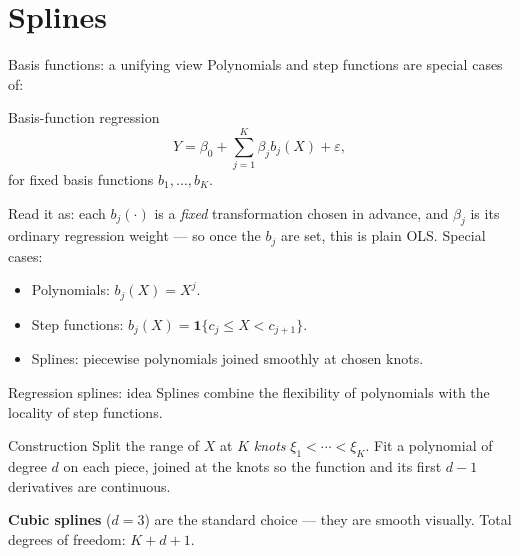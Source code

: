\documentclass[aspectratio=169,11pt]{beamer}
\begin{document}
\section{Splines}

\begin{frame}{Basis functions: a unifying view}
  Polynomials and step functions are special cases of:
  \begin{block}{Basis-function regression}
    \[
      Y = \beta_0 + \sum_{j=1}^K \beta_j b_j(X) + \varepsilon,
    \]
    for fixed basis functions $b_1, \ldots, b_K$.
  \end{block}
  \begin{readme}
    Read it as: each $b_j(\cdot)$ is a \emph{fixed} transformation
    chosen in advance, and $\beta_j$ is its ordinary regression weight
    --- so once the $b_j$ are set, this is plain OLS. Special cases:
    \begin{itemize}
      \item Polynomials: $b_j(X) = X^j$.
      \item Step functions: $b_j(X) = \mathbf{1}\{c_j \le X < c_{j+1}\}$.
      \item Splines: piecewise polynomials joined smoothly at chosen
            knots.
    \end{itemize}
  \end{readme}
\end{frame}

\begin{frame}{Regression splines: idea}
  Splines combine the flexibility of polynomials with the locality of
  step functions.
  \begin{block}{Construction}
    Split the range of $X$ at $K$ \emph{knots}
    $\xi_1 < \cdots < \xi_K$. Fit a polynomial of degree $d$ on each
    piece, joined at the knots so the function and its first $d-1$
    derivatives are continuous.
  \end{block}
  \begin{takeaway}
    \textbf{Cubic splines} ($d = 3$) are the standard choice --- they
    are smooth visually. Total degrees of freedom: $K + d + 1$.
  \end{takeaway}
\end{frame}
\end{document}
